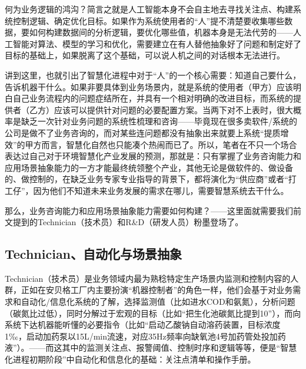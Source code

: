\documentclass[]{book}
\begin{document}
何为业务逻辑的鸿沟？简言之就是人工智能本身不会自主地去寻找关注点、构建系统控制逻辑、确定优化目标。如果作为系统使用者的``人''提不清楚要收集哪些数据，要如何构建数据间的分析逻辑，要优化哪些值，机器本身是无法代劳的------人工智能对算法、模型的学习和优化，需要建立在有人替他抽象好了问题和制定好了目标的基础上，如果脱离了这个基础，可以说人机之间的对话根本无法进行。

讲到这里，也就引出了智慧化进程中对于``人''的一个核心需要：知道自己要什么，告诉机器干什么。如果非要具体到业务场景内，就是系统的使用者（甲方）应该明白自己业务流程内的问题症结所在，并具有一个相对明确的改进目标，而系统的提供者（乙方）应该可以提供针对问题的必要配置方案。当两下对不上表时，很大概率是缺乏一次针对业务问题的系统性梳理和咨询------毕竟现在很多卖软件/系统的公司是做不了业务咨询的，而对某些连问题都没有抽象出来就要上系统``提质增效''的甲方而言，智慧化自然也只能凑个热闹而已了。所以，笔者在不只一个场合表达过自己对于环境智慧化产业发展的预测，那就是：只有掌握了业务咨询能力和应用场景抽象能力的一方才能最终统领整个产业，其他无论是做软件的、做设备的、做控制的，在缺乏业务专家专业指导的背景下，都将演化为``供应商''或者``打工仔''，因为他们不知道未来业务发展的需求在哪儿，需要智慧系统去干什么。

那么，业务咨询能力和应用场景抽象能力需要如何构建？------这里面就需要我们前文提到的Technician（技术员）和R\&D（研发人员）粉墨登场了。

\hypertarget{technicianux81eaux52a8ux5316ux4e0eux573aux666fux62bdux8c61}{%
\subsection{Technician、自动化与场景抽象}\label{technicianux81eaux52a8ux5316ux4e0eux573aux666fux62bdux8c61}}

Technician（技术员）是业务领域内最为熟稔特定生产场景内监测和控制内容的人群，正如在安贝格工厂内主要扮演``机器控制者''的角色一样，他们会基于对业务需求和自动化/信息化系统的了解，选择监测值（比如进水COD和氨氮），分析问题（碳氮比过低），同时分解过于宏观的目标（比如``把生化池碳氮比提到10''），而向系统下达机器能听懂的必要指令（比如``启动乙酸钠自动溶药装置，目标浓度1‰，启动加药泵以15L/min流速，对应35Hz频率向缺氧池4号加药管处投加药液''）。------而这其中的监测关注点、报警阈值、控制时序和逻辑等等，便是``智慧化进程初期阶段''中自动化和信息化的基础：关注点清单和操作手册。
\end{document}
